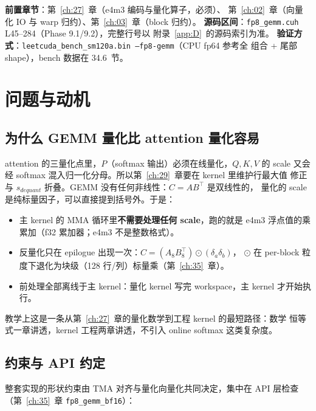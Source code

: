 \textbf{前置章节}：第~\ref{ch:27}~章（e4m3 编码与量化算子，必须）、
第~\ref{ch:02}~章（向量化 IO 与 warp 归约）、第~\ref{ch:03}~章（block 归约）。
\textbf{源码区间}：\texttt{fp8\_gemm.cuh} L45--284（Phase 9.1/9.2），完整行号以
附录~\ref{app:D}~的源码索引为准。
\textbf{验证方式}：\texttt{leetcuda\_bench\_sm120a.bin --fp8-gemm}（CPU fp64 参考全
组合 + 尾部 shape），bench 数据在 34.6~节。

\section{问题与动机}

\subsection{为什么 GEMM 量化比 attention 量化容易}

attention 的三量化点里，$P$（softmax 输出）必须在线量化，$Q,K,V$ 的 scale 又会
经 softmax 混入归一化分母。所以第~\ref{ch:29}~章要在 kernel 里维护行最大值
修正与 $s_{dequant}$ 折叠。GEMM 没有任何非线性：$C=AB^{\top}$ 是双线性的，
量化的 scale 是纯标量因子，可以直接提到括号外。于是：

\begin{itemize}[itemsep=1pt,topsep=2pt]
  \item 主 kernel 的 MMA 循环里\textbf{不需要处理任何 scale}，跑的就是 e4m3
        浮点值的乘累加（f32 累加器；e4m3 不是整数格式）。
  \item 反量化只在 epilogue 出现一次：$C = (A_8 B_8^{\top})\odot(\delta_a\delta_b)$，
        $\odot$ 在 per-block 粒度下退化为块级（128 行/列）标量乘（第~\ref{ch:35}~章）。
  \item 前处理全部离线于主 kernel：量化 kernel 写完 workspace，主 kernel 才开始执行。
\end{itemize}

教学上这是一条从第~\ref{ch:27}~章的量化数学到工程 kernel 的最短路径：数学
恒等式一章讲透，kernel 工程两章讲透，不引入 online softmax 这类复杂度。

\subsection{约束与 API 约定}

整套实现的形状约束由 TMA 对齐与量化向量化共同决定，集中在 API
层检查（第~\ref{ch:35}~章 \texttt{fp8\_gemm\_bf16}）：


